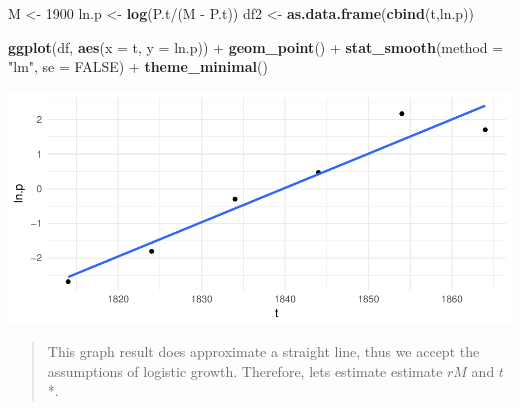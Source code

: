 \documentclass[]{article}
\newenvironment{Shaded}{\begin{snugshade}}{\end{snugshade}}
\newcommand{\KeywordTok}[1]{\textcolor[rgb]{0.13,0.29,0.53}{\textbf{{#1}}}}
\newcommand{\DataTypeTok}[1]{\textcolor[rgb]{0.13,0.29,0.53}{{#1}}}
\newcommand{\DecValTok}[1]{\textcolor[rgb]{0.00,0.00,0.81}{{#1}}}
\newcommand{\StringTok}[1]{\textcolor[rgb]{0.31,0.60,0.02}{{#1}}}
\newcommand{\OtherTok}[1]{\textcolor[rgb]{0.56,0.35,0.01}{{#1}}}
\newcommand{\NormalTok}[1]{{#1}}
\begin{document}
\begin{Shaded}
\begin{Highlighting}[]
\NormalTok{M <-}\StringTok{ }\DecValTok{1900}
\NormalTok{ln.p <-}\StringTok{ }\KeywordTok{log}\NormalTok{(P.t/(M -}\StringTok{ }\NormalTok{P.t))}
\NormalTok{df2 <-}\StringTok{ }\KeywordTok{as.data.frame}\NormalTok{(}\KeywordTok{cbind}\NormalTok{(t,ln.p))}
\end{Highlighting}
\end{Shaded}

\begin{Shaded}
\begin{Highlighting}[]
\KeywordTok{ggplot}\NormalTok{(df, }\KeywordTok{aes}\NormalTok{(}\DataTypeTok{x =} \NormalTok{t, }\DataTypeTok{y =} \NormalTok{ln.p)) +}
\StringTok{  }\KeywordTok{geom_point}\NormalTok{() +}
\StringTok{  }\KeywordTok{stat_smooth}\NormalTok{(}\DataTypeTok{method =} \StringTok{"lm"}\NormalTok{, }\DataTypeTok{se =} \OtherTok{FALSE}\NormalTok{) +}
\StringTok{  }\KeywordTok{theme_minimal}\NormalTok{()}
\end{Highlighting}
\end{Shaded}

\includegraphics{Christophe_Hunt_hw10_files/figure-latex/unnamed-chunk-5-1.pdf}

\begin{quote}
This graph result does approximate a straight line, thus we accept the
assumptions of logistic growth. Therefore, lets estimate estimate \(rM\)
and \(t\)*.
\end{quote}

\begin{Shaded}
\end{Shaded}
\end{document}

